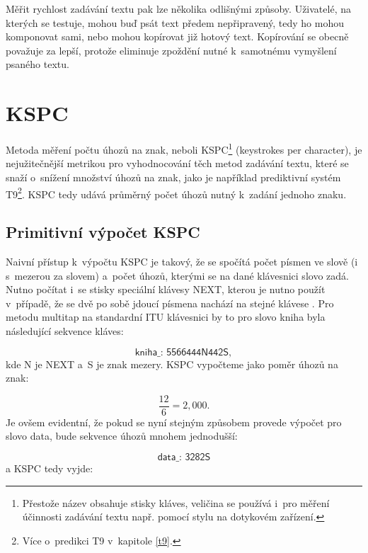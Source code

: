\documentclass[a4paper,11pt,openany]{book} %
\newcommand\exmp{\textsf}
\begin{document}
Měřit rychlost zadávání textu pak lze několika odlišnými způsoby. Uživatelé, na kterých se testuje, mohou buď psát text předem nepřipravený, tedy ho mohou komponovat sami, nebo mohou kopírovat již hotový text. Kopírování se obecně považuje za lepší, protože eliminuje zpoždění nutné k~samotnému vymyšlení psaného textu. \parencite[2]{tarvainen2010beginner} %

\section{KSPC}

Metoda měření počtu úhozů na znak, neboli KSPC\footnote{Přestože název obsahuje stisky kláves, veličina se používá i~pro měření účinnosti zadávání textu např. pomocí stylu na dotykovém zařízení.} (keystrokes per character), je nejužitečnější metrikou pro vyhodnocování těch metod zadávání textu, které se snaží o~snížení množství úhozů na znak, jako  je například prediktivní systém T9\footnote{Více o~predikci T9 v~kapitole \ref{t9}.}. KSPC tedy udává průměrný počet úhozů nutný k~zadání jednoho znaku.

\subsection{Primitivní výpočet KSPC}

Naivní přístup k~výpočtu KSPC je takový, že se spočítá počet písmen ve slově (i s~mezerou za slovem) a~počet úhozů, kterými se na dané klávesnici slovo zadá. Nutno počítat i~se stisky speciální klávesy \exmp{NEXT}, kterou je nutno použít v~případě, že se dvě po sobě jdoucí písmena nachází na stejné klávese \parencite[10]{silfverberg2000predicting}. %
Pro metodu multitap na standardní ITU klávesnici by to pro slovo \exmp{kniha} byla následující sekvence kláves:

\[
	\exmp{kniha\_: 5566444N442S},
\]
kde \exmp{N} je \exmp{NEXT} a~\exmp{S} je znak mezery. KSPC vypočteme jako poměr úhozů na znak:

\[
	\frac{12}{6} = 2,000.
\]
Je ovšem evidentní, že pokud se nyní stejným způsobem provede výpočet pro slovo \exmp{data}, bude sekvence úhozů mnohem jednodušší:

\[
	\exmp{data\_: 3282S}
\]
a KSPC tedy vyjde:
\end{document}
